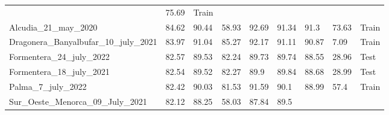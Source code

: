 \begin{table}[H]
{\begin{tabular}{lllllllll}
                                                   & 75.69               &
            {\color[HTML]{66c2a5} Train}
            \\
            Alcudia\_21\_may\_2020                 & 84.62               &
            90.44
                                                   & 58.93               &
            92.69
                                                   & 91.34               & 91.3
                                                   & 73.63               &
            {\color[HTML]{66c2a5} Train}
            \\
            Dragonera\_Banyalbufar\_10\_july\_2021 & 83.97               &
            91.04
                                                   & 85.27               &
            92.17
                                                   & 91.11               &
            90.87
                                                   & 7.09                &
            {\color[HTML]{66c2a5} Train}
            \\
            Formentera\_24\_july\_2022             & 82.57               &
            89.53
                                                   & 82.24               &
            89.73
                                                   & 89.74               &
            88.55
                                                   & 28.96               &
            {\color[HTML]{fc8d62} Test}
            \\
            Formentera\_18\_july\_2021             & 82.54               &
            89.52
                                                   & 82.27               & 89.9
                                                   & 89.84               &
            88.68
                                                   & 28.99               &
            {\color[HTML]{fc8d62} Test}
            \\
            Palma\_7\_july\_2022                   & 82.42               &
            90.03
                                                   & 81.53               &
            91.59
                                                   & 90.1                &
            88.99
                                                   & 57.4                &
            {\color[HTML]{66c2a5} Train}
            \\
            Sur\_Oeste\_Menorca\_09\_July\_2021    & 82.12               &
            88.25
                                                   & 58.03               &
            87.84
                                                   & 89.5                &

\end{tabular}}
\end{table}
